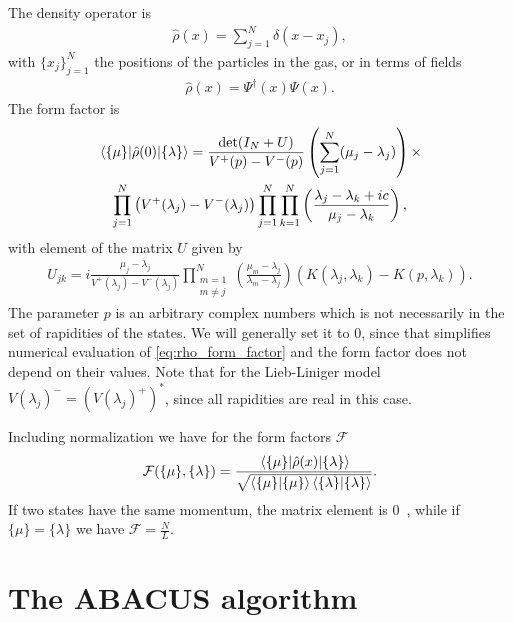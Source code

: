 \documentclass[11pt, a4paper]{report} %
\begin{document}
The density operator is~\cite{Nardis2015}
\begin{align}
  \hat{\rho}(x) = \sum_{j=1}^N \delta(x-x_j),
\end{align}
with \(\{x_j\}_{j=1}^N\) the positions of the particles in the gas, or in terms of fields~\cite{slavnov90_noneq_time_curren_correl_funct}
\begin{align}
  \label{eq:44}
  \hat{\rho}(x) = \Psi^{\dag}(x)\Psi(x).
\end{align}
The form factor is~\cite{slavnov90_noneq_time_curren_correl_funct, Nardis2015}
\begin{multline}
  \label{eq:rho_form_factor}
  \matrixel{\{\mu\}}{\hat{\rho}(0)}{\{\lambda\}} = \frac{\det(I_N +U)}{V^+(p) - V^-(p)}
  \left(\sum_{j=1}^N(\mu_j-\lambda_j)\right) \times\\ \prod_{j=1}^N\left(V^+(\lambda_j) - V^-(\lambda_j)\right)\prod_{j=1}^N\prod_{k=1}^N\left(\frac{\lambda_j-\lambda_k+ic}{\mu_j-\lambda_k}\right),
\end{multline}
with element of the matrix \(U\) given by
\begin{align}
  U_{jk} = i \frac{\mu_j-\lambda_j}{V^+(\lambda_j) -V^-(\lambda_j)}\prod_{\substack{m=1\\m\neq j}}^N \left(\frac{\mu_m - \lambda_j}{\lambda_m-\lambda_j}\right) \left(K(\lambda_j, \lambda_k) - K(p, \lambda_k)\right).
\end{align}
The parameter \(p\) is an arbitrary complex numbers which is not necessarily in the set of rapidities of the states.
We will generally set it to 0, since that simplifies numerical evaluation of \cref{eq:rho_form_factor} and the form factor does not depend on their values.
Note that for the Lieb-Liniger model \(V(\lambda_j)^{-} = (V(\lambda_j)^{+})^{*}\), since all rapidities are real in this case.

Including normalization we have for the form factors \(\mathcal{F}\)~\cite{Nardis2015}
\begin{align}
  \label{eq:21}
  \mathcal{F}(\{\mu\}, \{\lambda\}) = \frac{\matrixel{\{\mu\}}{\hat{\rho}(x)}{\{\lambda\}}}{\sqrt{\innerproduct{\{\mu\}}{\{\mu\}}\innerproduct{\{\lambda\}}{\{\lambda\}}}}.
\end{align}
If two states have the same momentum, the matrix element is 0~\cite{slavnov90_noneq_time_curren_correl_funct}, while if $\{\mu\} = \{\lambda\}$ we have $\mathcal{F}=\frac{N}{L}$.


\chapter{The ABACUS algorithm}\label{chap:abacus}
\end{document}
